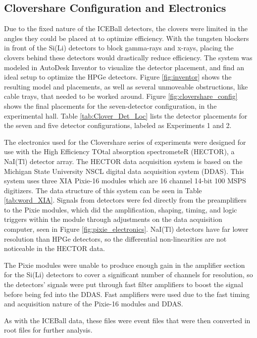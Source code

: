 \subsection{Clovershare Configuration and Electronics}

Due to the fixed nature of the ICEBall detectors, the clovers were limited in the angles they could be placed at to optimize efficiency. With the tungsten blockers in front of the Si(Li) detectors to block gamma-rays and x-rays, placing the clovers behind these detectors would drastically reduce efficiency. The system was modeled in AutoDesk Inventor \citep{autodesk:_inventor} to visualize the detector placement, and find an ideal setup to optimize the HPGe detectors. Figure \ref{fig:inventor} shows the resulting model and placements, as well as several unmoveable obstructions, like cable trays, that needed to be worked around. Figure \ref{fig:clovershare_config} shows the final placements for the seven-detector configuration, in the experimental hall. Table \ref{tab:Clover_Det_Loc} lists the detector placements for the seven and five detector configurations, labeled as Experiments 1 and 2.





The electronics used for the Clovershare series of experiments were designed for use with the High Efficiency TOtal absorption spectrometeR (HECTOR), a NaI(Tl) detector array\citep{reingold19:_HECTOR}. The HECTOR data acquisition system is based on the Michigan State University NSCL digital data acquisition system (DDAS). This system uses three XIA Pixie-16 modules \citep{xia:_pixie} which are 16 channel 14-bit 100 MSPS digitizers. The data structure of this system can be seen in Table \ref{tab:word_XIA}. Signals from detectors were fed directly from the preamplifiers to the Pixie modules, which did the amplification, shaping, timing, and logic triggers within the module through adjustments on the data acquisition computer, seen in Figure \ref{fig:pixie_electronics}. NaI(Tl) detectors have far lower resolution than HPGe detectors, so the differential non-linearities are not noticeable in the HECTOR data.



The Pixie modules were unable to produce enough gain in the amplifier section for the Si(Li) detectors to cover a significant number of channels for resolution, so the detectors' signals were put through fast filter amplifiers \citep{ortec:_fastamp} to boost the signal before being fed into the DDAS. Fast amplifiers were used due to the fast timing and acquisition nature of the Pixie-16 modules and DDAS. 

As with the ICEBall data, these files were event files that were then converted in root files for further analysis.

